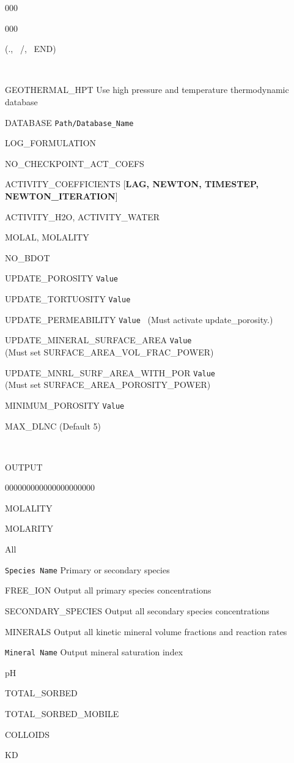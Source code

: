 \documentclass[12pt]{article}
\newcommand\keyend{{(., \, /, \, END)}}
\begin{document}
\begin{deflist}{000}
\begin{deflist}{000}
\item [\keyend]

~\\

\item[GEOTHERMAL\_HPT] Use high pressure and temperature thermodynamic database
\item[DATABASE] {\tt Path/Database\_Name}
\item[LOG\_FORMULATION]
\item[NO\_CHECKPOINT\_ACT\_COEFS]
\item[ACTIVITY\_COEFFICIENTS] [{\bf LAG, NEWTON, TIMESTEP, NEWTON\_ITERATION}]
\item[ACTIVITY\_H2O, ACTIVITY\_WATER]
\item[MOLAL, MOLALITY]
\item[NO\_BDOT]
\item[UPDATE\_POROSITY] {\tt Value}
\item[UPDATE\_TORTUOSITY] {\tt Value}
\item[UPDATE\_PERMEABILITY] {\tt Value} \ (Must activate update\_porosity.)
\item[UPDATE\_MINERAL\_SURFACE\_AREA] {\tt Value} \\
(Must set SURFACE\_AREA\_VOL\_FRAC\_POWER)
\item[UPDATE\_MNRL\_SURF\_AREA\_WITH\_POR] {\tt Value} \\
(Must set SURFACE\_AREA\_POROSITY\_POWER)
\item[MINIMUM\_POROSITY] {\tt Value}
\item[MAX\_DLNC] \rm (Default 5)

~\\

\item[OUTPUT] ~
\begin{deflist}{000000000000000000000}
\item[MOLALITY]
\item[MOLARITY]
\item[All]
\item[\tt Species Name] Primary or secondary species
\item[FREE\_ION] Output all primary species concentrations
\item[SECONDARY\_SPECIES] Output all secondary species concentrations
\item[MINERALS] Output all kinetic mineral volume fractions and reaction rates
\item[\tt Mineral Name] Output mineral saturation index
\item[pH]
\item[TOTAL\_SORBED]
\item[TOTAL\_SORBED\_MOBILE]
\item[COLLOIDS]
\item[KD]
\end{deflist}


\end{deflist}
\end{deflist}
\end{document}
